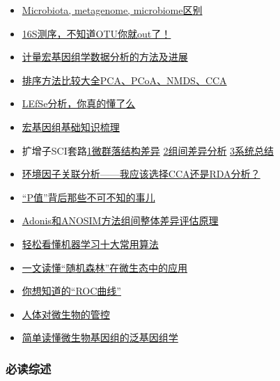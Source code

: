 \documentclass[]{article}
\providecommand{\tightlist}{%
  \setlength{\itemsep}{0pt}\setlength{\parskip}{0pt}}
\numberwithin{figure}{section}
\numberwithin{table}{section}
\begin{document}
\begin{itemize}
\tightlist
\item
  \href{http://mp.weixin.qq.com/s/kBbWD6ircc4UHE-ma-6a1Q}{Microbiota, metagenome, microbiome区别}
\item
  \href{http://mp.weixin.qq.com/s/yDmUgRzgJDtxdiJqwpGM1A}{16S测序，不知道OTU你就out了！}
\item
  \href{http://mp.weixin.qq.com/s/cDq1vwMig2V0lJrswP3gcA}{计量宏基因组学数据分析的方法及进展}
\item
  \href{http://mp.weixin.qq.com/s/juMOVzZfdUD4w9M2l1Bh6g}{排序方法比较大全PCA、PCoA、NMDS、CCA}
\item
  \href{http://mp.weixin.qq.com/s/5K8OTMee6CwDZz51YWJEDg}{LEfSe分析，你真的懂了么}
\item
  \href{http://mp.weixin.qq.com/s/d-cmrrnFlI8gOBQtKLHxWw}{宏基因组基础知识梳理}
\item
  扩增子SCI套路\href{http://mp.weixin.qq.com/s/tRc4PBS-PZh6ghxX1nlNcw}{1微群落结构差异} \href{http://mp.weixin.qq.com/s/yI1KlyluNyoPM0DE5LOAfg}{2组间差异分析} \href{http://mp.weixin.qq.com/s/V4VCrJU4cSSpof2QDoDKNQ}{3系统总结}
\item
  \href{http://mp.weixin.qq.com/s/8D4vlBIhyYg0ZHtsdGn_kA}{环境因子关联分析------我应该选择CCA还是RDA分析？}
\item
  \href{http://mp.weixin.qq.com/s/lKkvJ7s8dshe7mvDOnl6_w}{``P值''背后那些不可不知的事儿}
\item
  \href{http://mp.weixin.qq.com/s/b2kjedvI-8hYSkTQxKUalA}{Adonis和ANOSIM方法组间整体差异评估原理}
\item
  \href{http://mp.weixin.qq.com/s/sU__UxDDmhs-4pMGX-5rSQ}{轻松看懂机器学习十大常用算法}
\item
  \href{http://mp.weixin.qq.com/s/58VAF03uO3nBPfp7eboqUA}{一文读懂``随机森林''在微生态中的应用}
\item
  \href{http://mp.weixin.qq.com/s/wRISqBabnFrtWD4TrCgBOg}{你想知道的``ROC曲线''}
\item
  \href{https://mp.weixin.qq.com/s/DYykdQ8DtBRIG7rzEK9Xug}{人体对微生物的管控}
\item
  \href{http://mp.weixin.qq.com/s/p7PMqo2Ld0Kbm8_3IgRuuQ}{简单读懂微生物基因组的泛基因组学}
\end{itemize}

\hypertarget{ux5fc5ux8bfbux7efcux8ff0}{%
\subsubsection{必读综述}\label{ux5fc5ux8bfbux7efcux8ff0}}
\end{document}
